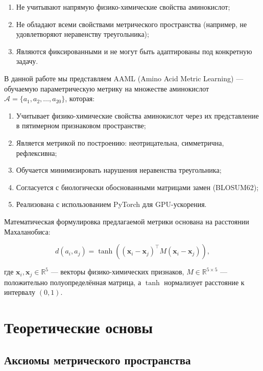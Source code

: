 \documentclass[12pt]{article}
\begin{document}
\begin{enumerate}
    \item Не учитывают напрямую физико-химические свойства аминокислот;
    \item Не обладают всеми свойствами метрического пространства (например, не удовлетворяют неравенству треугольника);
    \item Являются фиксированными и не могут быть адаптированы под конкретную задачу.
\end{enumerate}

В данной работе мы представляем AAML (Amino Acid Metric Learning) --- обучаемую параметрическую метрику на множестве аминокислот $\mathcal{A} = \{a_1, a_2, \dots, a_{20}\}$, которая:

\begin{enumerate}
    \item Учитывает физико-химические свойства аминокислот через их представление в пятимерном признаковом пространстве;
    \item Является метрикой по построению: неотрицательна, симметрична, рефлексивна;
    \item Обучается минимизировать нарушения неравенства треугольника;
    \item Согласуется с биологически обоснованными матрицами замен (BLOSUM62);
    \item Реализована с использованием PyTorch для GPU-ускорения.
\end{enumerate}

Математическая формулировка предлагаемой метрики основана на расстоянии Махаланобиса:

\begin{equation}
d(a_i, a_j) = \tanh\left((\mathbf{x}_i - \mathbf{x}_j)^{\top} M (\mathbf{x}_i - \mathbf{x}_j)\right),
\label{eq:metric}
\end{equation}

где $\mathbf{x}_i, \mathbf{x}_j \in \mathbb{R}^5$ --- векторы физико-химических признаков, $M \in \mathbb{R}^{5 \times 5}$ --- положительно полуопределённая матрица, а $\tanh$ нормализует расстояние к интервалу $(0, 1)$.

\section{Теоретические основы}

\subsection{Аксиомы метрического пространства}
\end{document}
